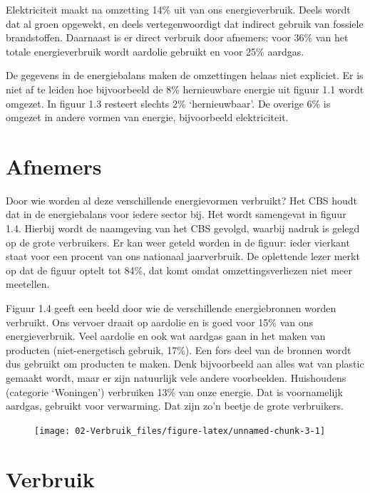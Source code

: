 \documentclass[
  11pt,
  a4paper,
]{book}
\begin{document}
Elektriciteit maakt na omzetting 14\% uit van ons energieverbruik. Deels wordt dat al groen opgewekt, en deels vertegenwoordigt dat indirect gebruik van fossiele brandstoffen. Daarnaast is er direct verbruik door afnemers: voor 36\% van het totale energieverbruik wordt aardolie gebruikt en voor 25\% aardgas.

De gegevens in de energiebalans maken de omzettingen helaas niet expliciet. Er is niet af te leiden hoe bijvoorbeeld de 8\% hernieuwbare energie uit figuur 1.1 wordt omgezet. In figuur 1.3 resteert slechts 2\% `hernieuwbaar'. De overige 6\% is omgezet in andere vormen van energie, bijvoorbeeld elektriciteit.

\hypertarget{afnemers}{%
\section{Afnemers}\label{afnemers}}

Door wie worden al deze verschillende energievormen verbruikt? Het CBS houdt dat in de energiebalans voor iedere sector bij. Het wordt samengevat in figuur 1.4. Hierbij wordt de naamgeving van het CBS gevolgd, waarbij nadruk is gelegd op de grote verbruikers. Er kan weer geteld worden in de figuur: ieder vierkant staat voor een procent van ons nationaal jaarverbruik. De oplettende lezer merkt op dat de figuur optelt tot 84\%, dat komt omdat omzettingsverliezen niet meer meetellen.

Figuur 1.4 geeft een beeld door wie de verschillende energiebronnen worden verbruikt. Ons vervoer draait op aardolie en is goed voor 15\% van ons energieverbruik. Veel aardolie en ook wat aardgas gaan in het maken van producten (niet-energetisch gebruik, 17\%). Een fors deel van de bronnen wordt dus gebruikt om producten te maken. Denk bijvoorbeeld aan alles wat van plastic gemaakt wordt, maar er zijn natuurlijk vele andere voorbeelden. Huishoudens (categorie `Woningen') verbruiken 13\% van onze energie. Dat is voornamelijk aardgas, gebruikt voor verwarming. Dat zijn zo'n beetje de grote verbruikers.

\begin{figure}[b]

{\centering \texttt{[image: 02-Verbruik\_files/figure-latex/unnamed-chunk-3-1]} 

}

\end{figure}

\hypertarget{verbruik-1}{%
\section{Verbruik}\label{verbruik-1}}
\end{document}
